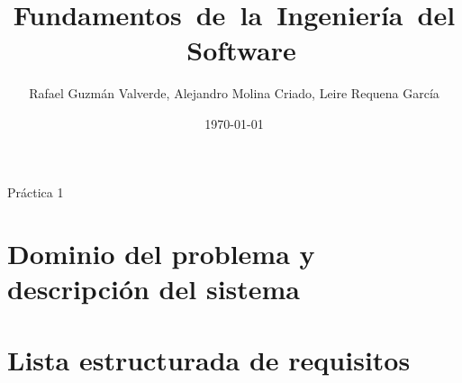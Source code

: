 \documentclass[10pt]{report}
\author{Rafael Guzmán Valverde, Alejandro Molina Criado, Leire Requena García}
\title{Fundamentos\ de\ la\ Ingeniería\ del\ Software}
\date{\today}
\begin{document}
            {Práctica 1}
            {}
\tableofcontents

\pagebreak


\chapter{Dominio del problema y descripción del sistema}





\chapter{Lista estructurada de requisitos}




%

\end{document}
